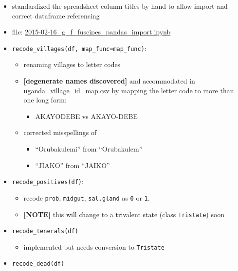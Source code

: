 \documentclass[letterpaper]{scrartcl}
\begin{document}
\begin{itemize}
\item
  standardized the spreadsheet column titles by hand to allow import and
  correct dataframe referencing
\item
  file:
  \href{file:///home/gus/Dropbox/common/ipy_notebooks/YALE/g_f_fuscipes_general/2015-02-16_g_f_fuscipes_pandas_import.ipynb}{2015-02-16\_g\_f\_fuscipes\_pandas\_import.ipynb}
\item
  \texttt{recode\_villages(df, map\_func=map\_func)}:

  \begin{itemize}
  \itemsep1pt\parskip0pt
  \item
    renaming villages to letter codes
  \item
    \textbf{{[}degenerate names discovered{]}} and accommodated
    in\\\href{file:///home/gus/Dropbox/uganda_data/data_repos/field_data/locations/names/uganda_village_id_map.csv}{uganda\_village\_id\_map.csv}
    by mapping the letter code to more than one long form:

    \begin{itemize}
    \itemsep1pt\parskip0pt
    \item
      AKAYODEBE vs AKAYO-DEBE
    \end{itemize}
  \item
    corrected misspellings of

    \begin{itemize}
    \itemsep1pt\parskip0pt
    \item
      ``Orubakulemi'' from ``Orubakulem''
    \item
      ``JIAKO'' from ``JAIKO''
    \end{itemize}
  \end{itemize}
\item
  \texttt{recode\_positives(df)}:

  \begin{itemize}
  \itemsep1pt\parskip0pt
  \item
    recode \texttt{prob}, \texttt{midgut}, \texttt{sal.gland} as
    \texttt{0} or \texttt{1}.
  \item
    \textbf{{[}NOTE{]}} this will change to a trivalent state (class
    \texttt{Tristate}) soon
  \end{itemize}
\item
  \texttt{recode\_tenerals(df)}

  \begin{itemize}
  \itemsep1pt\parskip0pt
  \item
    implemented but needs conversion to \texttt{Tristate}
  \end{itemize}
\item
  \texttt{recode\_dead(df)}


\end{itemize}
\end{document}
